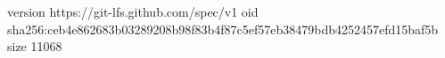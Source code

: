 version https://git-lfs.github.com/spec/v1
oid sha256:ceb4e862683b03289208b98f83b4f87c5ef57eb38479bdb4252457efd15baf5b
size 11068
